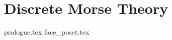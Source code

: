 \documentclass[class=article, crop=false]{standalone}
\begin{document}
\section{Discrete Morse Theory}

{prologue.tex}
{face_poset.tex}
\end{document}
